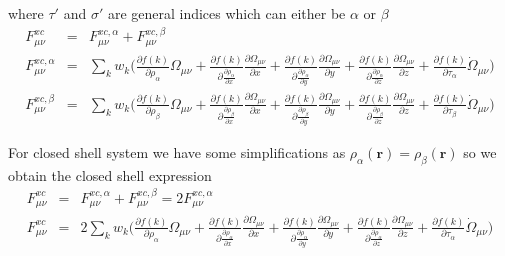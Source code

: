 \documentclass[preprint,preprintnumbers,amsmath,amssymb,11pt]{revtex4}
\begin{document}
where $\tau'$ and $\sigma'$ are general indices which can either be $\alpha$ or $\beta$
\begin{eqnarray}\label{F matrixunres}
F^{xc}_{\mu \nu} &=&  F^{xc,\alpha}_{\mu \nu} + F^{xc,\beta}_{\mu \nu}\nonumber \\
F^{xc,\alpha}_{\mu \nu} &=& \sum_{k} w_{k} \biggl( \frac{\partial f(k)}{\partial \rho_{\alpha}} \Omega_{\mu \nu}
+ \frac{\partial f(k)}{\partial \frac{\partial \rho_{\alpha}}{\partial x}} \frac{\partial \Omega_{\mu \nu}}{\partial x}
+ \frac{\partial f(k)}{\partial \frac{\partial \rho_{\alpha}}{\partial y}} \frac{\partial \Omega_{\mu \nu}}{\partial y}
+ \frac{\partial f(k)}{\partial \frac{\partial \rho_{\alpha}}{\partial z}} \frac{\partial \Omega_{\mu \nu}}{\partial z} 
+ \frac{\partial f(k)}{\partial \tau_{\alpha}} \dot{\Omega}_{\mu \nu} \biggr) \nonumber \\
F^{xc,\beta}_{\mu \nu} &=& \sum_{k} w_{k} \biggl( \frac{\partial f(k)}{\partial \rho_{\beta}} \Omega_{\mu \nu}
+ \frac{\partial f(k)}{\partial \frac{\partial \rho_{\beta}}{\partial x}} \frac{\partial \Omega_{\mu \nu}}{\partial x}
+ \frac{\partial f(k)}{\partial \frac{\partial \rho_{\beta}}{\partial y}} \frac{\partial \Omega_{\mu \nu}}{\partial y}
+ \frac{\partial f(k)}{\partial \frac{\partial \rho_{\beta}}{\partial z}} \frac{\partial \Omega_{\mu \nu}}{\partial z} 
+ \frac{\partial f(k)}{\partial \tau_{\beta}} \dot{\Omega}_{\mu \nu}\biggr)\nonumber
\end{eqnarray}

For closed shell system we have some simplifications as $ \rho_{\alpha}(\textbf{r})  =  \rho_{\beta}(\textbf{r})$
so we obtain the closed shell expression
\begin{eqnarray}\label{F matrix1}
F^{xc}_{\mu \nu} &=&  F^{xc,\alpha}_{\mu \nu} + F^{xc,\beta}_{\mu \nu} = 2 F^{xc,\alpha}_{\mu \nu} \\
F^{xc}_{\mu \nu} &=& 2 \sum_{k} w_{k} \biggl( \frac{\partial f(k)}{\partial \rho_{\alpha}} \Omega_{\mu \nu}
+ \frac{\partial f(k)}{\partial \frac{\partial \rho_{\alpha}}{\partial x}} \frac{\partial \Omega_{\mu \nu}}{\partial x}
+ \frac{\partial f(k)}{\partial \frac{\partial \rho_{\alpha}}{\partial y}} \frac{\partial \Omega_{\mu \nu}}{\partial y}
+ \frac{\partial f(k)}{\partial \frac{\partial \rho_{\alpha}}{\partial z}} \frac{\partial \Omega_{\mu \nu}}{\partial z}
+ \frac{\partial f(k)}{\partial \tau_{\alpha}} \dot{\Omega}_{\mu \nu}\biggr) \nonumber 
\end{eqnarray}
\end{document}
